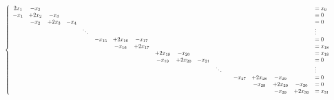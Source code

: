 \documentclass[notitlepage]{report}
\begin{document}
\begin{equation}
\nonumber
\resizebox{\hsize}{!}{
$\left\{
\begin{array}{cccccccccccccccccl}
2x_1  & -x_2  &       &         &        &          &           &          &                   &            &          &         &        &          &          &          &                   &= x_0 \\
-x_1  & +2x_2 & -x_3  &         &        &          &           &          &                   &            &          &         &        &          &          &          &                   &= 0 \\
      & -x_2  & +2x_3 & -x_4    &        &          &           &          &                   &            &          &         &        &          &          &          &                   &= 0 \\
      &       &       &         & \ddots &          &           &          &                   &            &          &         &        &          &          &          &                   &  \vdots \\
      &       &       &         &        &  -x_{15} &  +2x_{16} & -x_{17}  &                   &            &          &         &        &          &          &          &                   &= 0      \\
      &       &       &         &        &          &  -x_{16}  & +2x_{17} &                   &            &          &         &        &          &          &          &                   &= x_{18} \\
      &       &       &         &        &          &           &          &          +2x_{19} & -x_{20}    &          &         &        &          &          &          &                   &= x_{18} \\
      &       &       &         &        &          &           &          &           -x_{19} & +2x_{20}   & -x_{21}  &         &        &          &          &          &                   &= 0 \\
      &       &       &         &        &          &           &          &                   &            &          &  \ddots &        &          &          &          &                   &  \vdots \\
      &       &       &         &        &          &           &          &                   &            &          &         &        & -x_{27}  & +2x_{28} & -x_{29}  &                   &= 0 \\
      &       &       &         &        &          &           &          &                   &            &          &         &        &          & -x_{28}  & +2x_{29} & -x_{30}           &= 0 \\
      &       &       &         &        &          &           &          &                   &            &          &         &        &          &          & -x_{29}  & +2x_{30}          &= x_{31} \\
\end{array}
\right.$
}
\end{equation}
\end{document}
